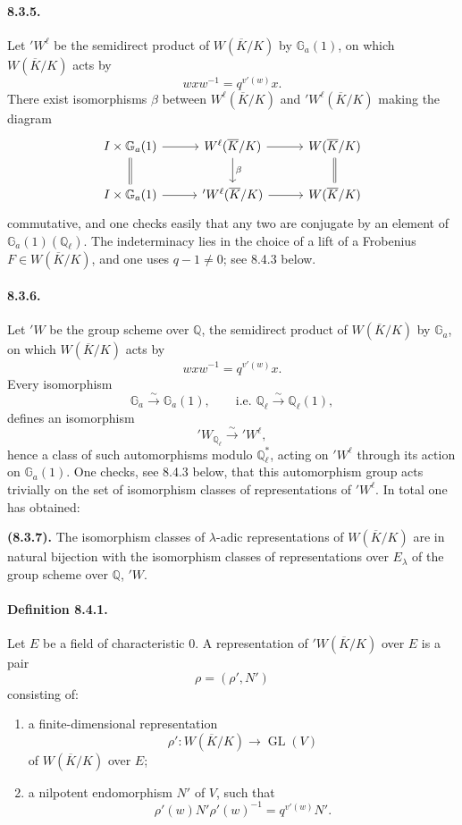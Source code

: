 \documentclass[10pt]{article}
\newcommand{\GL}{\operatorname{GL}}
\newcommand{\iso}{\xrightarrow{\sim}}
\providecommand{\GL}{\operatorname{GL}}
\providecommand{\GL}{\operatorname{GL}}
\begin{document}
\paragraph{8.3.5.} Let \({}'W^\ell\) be the semidirect product of \(W(\overline K/K)\) by \(\mathbb G_a(1)\), on which \(W(\overline K/K)\) acts by
\[
w x w^{-1}=q^{v'(w)}x.
\]
There exist isomorphisms \(\beta\) between \(W^\ell(\overline K/K)\) and \({}'W^\ell(\overline K/K)\) making the diagram
\[
\begin{tikzcd}[column sep=2.8em,row sep=2.0em]
I\times\mathbb G_a(1)\arrow[r]\arrow[d,equal]&
W^\ell(\overline K/K)\arrow[r]\arrow[d,"\beta"]&
W(\overline K/K)\arrow[d,equal]\\
I\times\mathbb G_a(1)\arrow[r]&
{}'W^\ell(\overline K/K)\arrow[r]&
W(\overline K/K)
\end{tikzcd}
\]
commutative, and one checks easily that any two are conjugate by an element of \(\mathbb G_a(1)(\mathbb Q_\ell)\). The indeterminacy lies in the choice of a lift of a Frobenius \(F\in W(\overline K/K)\), and one uses \(q-1\ne0\); see 8.4.3 below.

\paragraph{8.3.6.} Let \({}'W\) be the group scheme over \(\mathbb Q\), the semidirect product of \(W(\overline K/K)\) by \(\mathbb G_a\), on which \(W(\overline K/K)\) acts by
\[
w x w^{-1}=q^{v'(w)}x.
\]
Every isomorphism
\[
\mathbb G_a\iso\mathbb G_a(1),
\qquad\text{i.e. }\mathbb Q_\ell\iso\mathbb Q_\ell(1),
\]
defines an isomorphism
\[
{}'W_{\mathbb Q_\ell}\iso{}'W^\ell,
\]
hence a class of such automorphisms modulo \(\mathbb Q_\ell^*\), acting on \({}'W^\ell\) through its action on \(\mathbb G_a(1)\). One checks, see 8.4.3 below, that this automorphism group acts trivially on the set of isomorphism classes of representations of \({}'W^\ell\). In total one has obtained:

\noindent\textbf{(8.3.7).} The isomorphism classes of \(\lambda\)-adic representations of \(W(\overline K/K)\) are in natural bijection with the isomorphism classes of representations over \(E_\lambda\) of the group scheme over \(\mathbb Q\), \({}'W\).

\paragraph{Definition 8.4.1.} Let \(E\) be a field of characteristic \(0\). A representation of \({}'W(\overline K/K)\) over \(E\) is a pair
\[
\rho=(\rho',N')
\]
consisting of:
\begin{enumerate}[label=(\alph*)]
\item a finite-dimensional representation
\[
\rho':W(\overline K/K)\longrightarrow \GL(V)
\]
of \(W(\overline K/K)\) over \(E\);
\item a nilpotent endomorphism \(N'\) of \(V\), such that
\[
\tag{8.4.1.1}
\rho'(w)N'\rho'(w)^{-1}=q^{v'(w)}N'.
\]
\end{enumerate}
\end{document}
